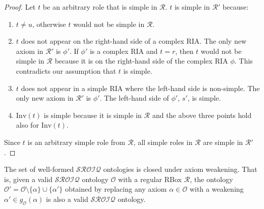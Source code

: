 \begin{proof}
Let $t$ be an arbitrary role that is simple in $\mathcal{R}$.
$t$ is simple in $\mathcal{R}'$ because:
\begin{enumerate}
    \item  $t \not= u$, otherwise $t$ would not be simple in $\mathcal{R}$.
    \item $t$ does not appear on the right-hand side of a complex RIA. The only new axiom in $\mathcal{R}'$ is $\phi'$. If $\phi'$ is a complex RIA and $t = r$, then $t$ would not be simple in $\mathcal{R}$ because it is on the right-hand side of the complex RIA $\phi$. This contradicts our assumption that $t$ is simple.
    \item $t$ does not appear in a simple RIA where the left-hand side is non-simple. The only new axiom in $\mathcal{R}'$ is $\phi'$. The left-hand side of $\phi'$, $s'$, is simple.
    \item $\mathrm{Inv}(t)$ is simple because it is simple in $\mathcal{R}$ and the above three points hold also for $\mathrm{Inv}(t)$.
\end{enumerate}

Since $t$ is an arbitrary simple role from $\mathcal{R}$, all simple roles in $\mathcal{R}$ are simple in $\mathcal{R}'$.
\end{proof}

\begin{theorem} \label{the:closed}
The set of well-formed $\mathcal{SROIQ}$ ontologies is closed under axiom weakening. That is, given a valid $\mathcal{SROIQ}$ ontology $\mathcal{O}$ with a regular RBox $\mathcal{R}$, the ontology $\mathcal{O}' = \mathcal{O} \setminus \{\alpha\} \cup \{\alpha'\}$ obtained by replacing any axiom $\alpha \in \mathcal{O}$ with a weakening $\alpha' \in g_\mathcal{O}(\alpha)$ is also a valid $\mathcal{SROIQ}$ ontology.
\end{theorem}

